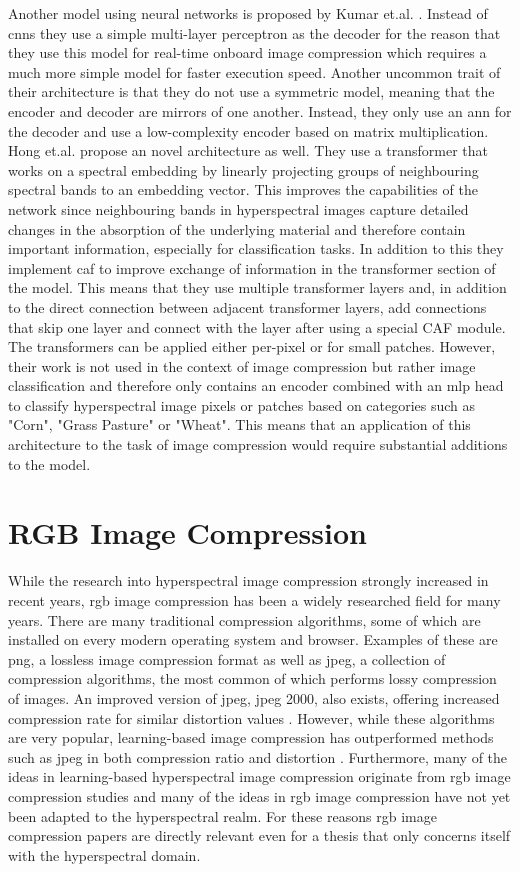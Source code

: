 Another model using neural networks is proposed by Kumar et.al. \citep{leal-taixe_onboard_2019}. Instead of \acp{cnn} they use a simple multi-layer perceptron as the decoder for the reason that they use this model for real-time onboard image compression which requires a much more simple model for faster execution speed. Another uncommon trait of their architecture is that they do not use a symmetric model, meaning that the encoder and decoder are mirrors of one another. Instead, they only use an \ac{ann} for the decoder and use a low-complexity encoder based on matrix multiplication.
Hong et.al. \citep{hong_spectralformer_2022} propose an novel architecture as well. They use a transformer that works on a spectral embedding by linearly projecting groups of neighbouring spectral bands to an embedding vector. This improves the capabilities of the network since neighbouring bands in hyperspectral images capture detailed changes in the absorption of the underlying material and therefore contain important information, especially for classification tasks.
In addition to this they implement \ac{caf} to improve exchange of information in the transformer section of the model. This means that they use multiple transformer layers and, in addition to the direct connection between adjacent transformer layers, add connections that skip one layer and connect with the layer after using a special CAF module.
The transformers can be applied either per-pixel or for small patches. However, their work is not used in the context of image compression but rather image classification and therefore only contains an encoder combined with an \ac{mlp} head to classify hyperspectral image pixels or patches based on categories such as "Corn", "Grass Pasture" or "Wheat". This means that an application of this architecture to the task of image compression would require substantial additions to the model. 
\section{RGB Image Compression \label{sec:ch2rgb}}
While the research into hyperspectral image compression strongly increased in recent years, \ac{rgb} image compression has been a widely researched field for many years. There are many traditional compression algorithms, some of which are installed on every modern operating system and browser. Examples of these are \ac{png}, a lossless image compression format as well as \ac{jpeg}, a collection of compression algorithms, the most common of which performs lossy compression of images. An improved version of \ac{jpeg}, \ac{jpeg} 2000, also exists, offering increased compression rate for similar distortion values \citep{fowler_three-dimensional_2007}.
However, while these algorithms are very popular, learning-based image compression has outperformed methods such as \ac{jpeg} in both compression ratio and distortion \citep{balle_end--end_2017,balle_variational_2018}. Furthermore, many of the ideas in learning-based hyperspectral image compression originate from \ac{rgb} image compression studies and many of the ideas in \ac{rgb} image compression have not yet been adapted to the hyperspectral realm. For these reasons \ac{rgb} image compression papers are directly relevant even for a thesis that only concerns itself with the hyperspectral domain.
